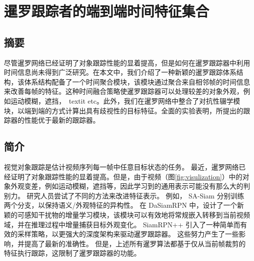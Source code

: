 \chapter{暹罗跟踪者的端到端时间特征集合}\label{chap:end}

\section{摘要}
尽管暹罗网络已经证明了对象跟踪性能的显着提高，但是如何在暹罗跟踪器中利用时间信息尚未得到广泛研究。在本文中，我们介绍了一种新颖的暹罗跟踪体系结构，该体系结构配备了一个时间聚合模块，该模块通过聚合来自相邻帧的时间信息来改善每帧的特征。这种时间融合策略使暹罗跟踪器可以处理较差的对象外观，例如运动模糊，遮挡，\ textit {etc}。此外，我们在暹罗网络中整合了对抗性辍学模块，以端到端的方式计算出具有歧视性的目标特征。全面的实验表明，所提出的跟踪器的性能优于最新的跟踪器。

\section{简介}
\label{sec:intro}
视觉对象跟踪是估计视频序列每一帧中任意目标状态的任务。 
最近，暹罗网络已经证明了对象跟踪性能的显着提高。但是，由于视频（图\ref{fig:visulization}）中的对象外观变差，例如运动模糊，遮挡等，因此学习到的通用表示可能没有那么大的判别力。
研究人员尝试了不同的方法来改进特征表示。
例如，
SA-Siam \cite{he2018twofold} 分别训练两个分支，以保持语义/外观特征的异构性。
在 DaSiamRPN \cite{zhu2018distractor}中，设计了一个新颖的可感知干扰物的增量学习模块，该模块可以有效地将常规嵌入转移到当前视频域，并在推理过程中增量捕获目标外观变化。
SiamRPN++ \cite{SiamRPN++} 引入了一种简单而有效的采样策略，以更强大的深度架构来驱动暹罗跟踪器。
这些努力产生了一些影响，并提高了最新的准确性。
但是，上述所有暹罗算法都基于仅从当前帧裁剪的特征执行跟踪，这限制了暹罗跟踪器的功能。

